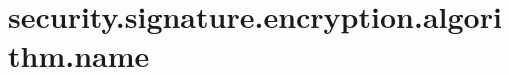 \section{security.signature.encryption.algorithm.name}
\label{configuration:SecuritySignatureEncryptionAlgorithmName}
\TODO
